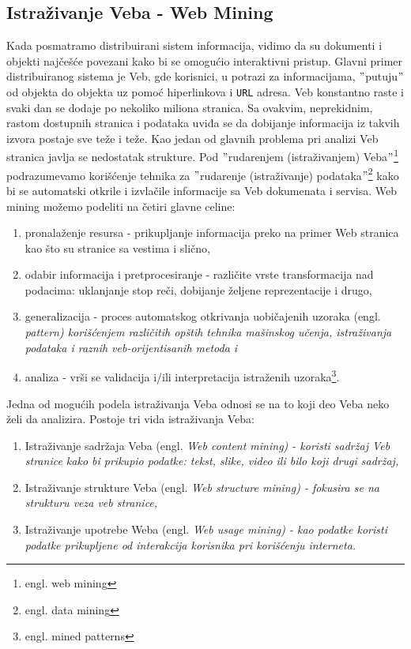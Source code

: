 \documentclass[a4paper]{article}
\begin{document}
\subsection{Istraživanje Veba - Web Mining}
\label{sec:veb}
Kada posmatramo distribuirani sistem informacija, vidimo da su dokumenti i objekti najčešće povezani kako bi se omogućio interaktivni pristup. Glavni primer distribuiranog sistema je Veb, gde korisnici, u potrazi za informacijama, $"$putuju$"$ od objekta do objekta uz pomoć hiperlinkova i \texttt{URL} adresa. Veb konstantno raste i svaki dan se dodaje po nekoliko miliona stranica. Sa ovakvim, neprekidnim, rastom dostupnih stranica i podataka uviđa se da dobijanje informacija iz takvih izvora postaje sve teže i teže. Kao jedan od glavnih problema pri analizi Veb stranica javlja se nedostatak strukture. Pod $"$rudarenjem (istraživanjem) Veba$"$\footnote{engl. web mining} podrazumevamo korišćenje tehnika za $"$rudarenje (istraživanje) podataka$"$\footnote{engl. data mining} kako bi se automatski otkrile i izvlačile informacije sa Veb dokumenata i servisa. Web mining možemo podeliti na četiri glavne celine:
\begin{enumerate}
\item pronalaženje resursa - prikupljanje informacija preko na primer Web stranica kao što su stranice sa vestima i slično,
\item odabir informacija i pretprocesiranje - različite vrste transformacija nad podacima: uklanjanje stop reči, dobijanje željene reprezentacije i drugo,
\item generalizacija - proces automatskog otkrivanja uobičajenih uzoraka (engl. \em{pattern}) korišćenjem različitih opštih tehnika mašinskog učenja, istraživanja podataka i raznih veb-orijentisanih metoda i  
\item analiza - vrši se validacija i/ili interpretacija istraženih uzoraka\footnote{engl.  mined patterns}. 
\end{enumerate}
Jedna od mogućih podela istraživanja Veba odnosi se na to koji deo Veba neko želi da analizira. Postoje tri vida istraživanja Veba:
\begin{enumerate}
\item Istraživanje sadržaja Veba (engl. \em{Web content mining}) - koristi sadržaj Veb stranice kako bi prikupio podatke: tekst, slike, video ili bilo koji drugi sadržaj,
\item Istraživanje strukture Veba (engl. \em{Web structure mining}) - fokusira se na strukturu veza veb stranice,
\item Istraživanje upotrebe Weba (engl. \em{Web usage mining}) - kao podatke koristi podatke prikupljene od interakcija korisnika pri korišćenju interneta.
\end{enumerate}
\end{document}
